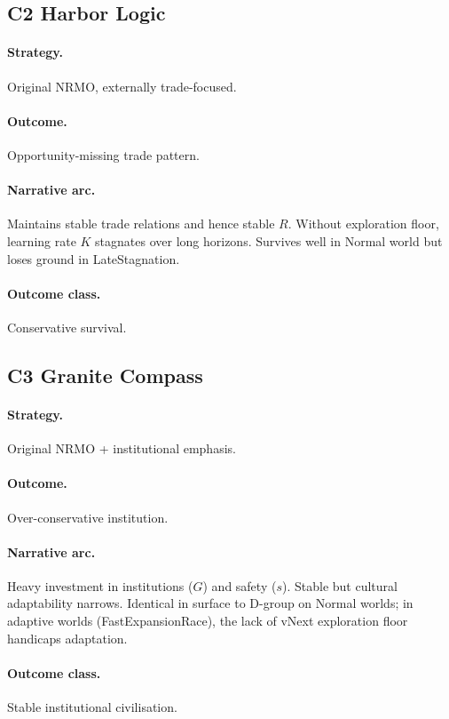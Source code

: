 \subsection{C2 Harbor Logic}
\label{civ:c2}

\paragraph{Strategy.} Original NRMO, externally trade-focused.
\paragraph{Outcome.} Opportunity-missing trade pattern.
\paragraph{Narrative arc.}
Maintains stable trade relations and hence stable $R$. Without
exploration floor, learning rate $K$ stagnates over long horizons.
Survives well in Normal world but loses ground in
LateStagnation.
\paragraph{Outcome class.} Conservative survival.

\subsection{C3 Granite Compass}
\label{civ:c3}

\paragraph{Strategy.} Original NRMO + institutional emphasis.
\paragraph{Outcome.} Over-conservative institution.
\paragraph{Narrative arc.}
Heavy investment in institutions ($G$) and safety ($s$). Stable
but cultural adaptability narrows. Identical in surface to D-group
on Normal worlds; in adaptive worlds (FastExpansionRace), the lack
of vNext exploration floor handicaps adaptation.
\paragraph{Outcome class.} Stable institutional civilisation.

